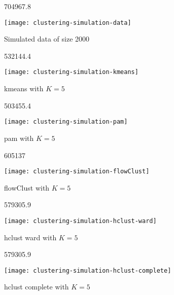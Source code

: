 \documentclass[12pt,a4paper,twoside]{article}
\begin{document}

\begin{figure}
\begin{center}
\begin{Schunk}
\begin{Soutput}
[1] 704967.8
\end{Soutput}
\end{Schunk}
\texttt{[image: clustering-simulation-data]}
\end{center}
\caption{ Simulated data of size 2000  }
\label{fig:data}
\end{figure}

\begin{figure}
\begin{center}
\begin{Schunk}
\begin{Soutput}
[1] 532144.4
\end{Soutput}
\end{Schunk}
\texttt{[image: clustering-simulation-kmeans]}
\end{center}
\caption{ kmeans with $K=5$ }
\label{fig:kmeans}
\end{figure}


\begin{figure}
\begin{center}
\begin{Schunk}
\begin{Soutput}
[1] 503455.4
\end{Soutput}
\end{Schunk}
\texttt{[image: clustering-simulation-pam]}
\end{center}
\caption{ pam with $K=5$ }
\label{fig:kmeans}
\end{figure}

\begin{figure}
\begin{center}
\begin{Schunk}
\begin{Soutput}
[1] 605137
\end{Soutput}
\end{Schunk}
\texttt{[image: clustering-simulation-flowClust]}
\end{center}
\caption{ flowClust with $K=5$ }
\label{fig:flowClust}
\end{figure}


\begin{figure}
\begin{center}
\begin{Schunk}
\begin{Soutput}
[1] 579305.9
\end{Soutput}
\end{Schunk}
\texttt{[image: clustering-simulation-hclust-ward]}
\end{center}
\caption{ hclust ward with $K=5$ }
\label{fig:hclust-ward}
\end{figure}


\begin{figure}
\begin{center}
\begin{Schunk}
\begin{Soutput}
[1] 579305.9
\end{Soutput}
\end{Schunk}
\texttt{[image: clustering-simulation-hclust-complete]}
\end{center}
\caption{ hclust complete with $K=5$ }
\label{fig:hclust-complete}
\end{figure}
\end{document}
